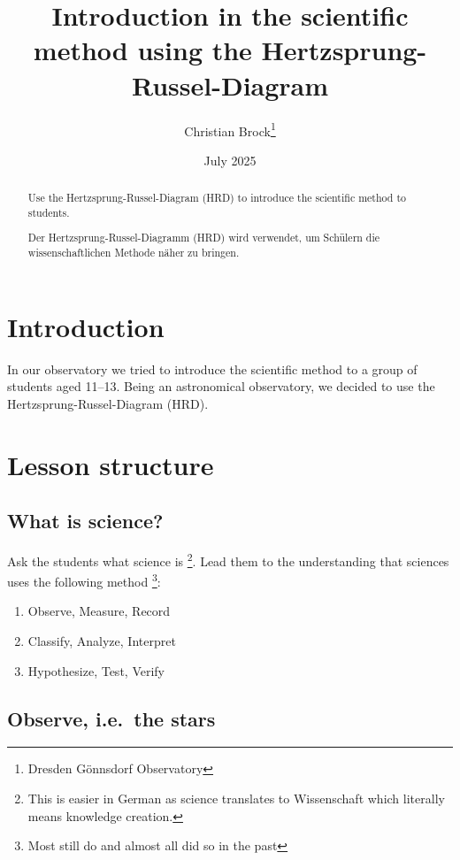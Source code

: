 \documentclass[a4paper]{article}
\author{Christian Brock\footnote{Dresden Gönnsdorf Observatory}}
\title{Introduction in the scientific method using the Hertzsprung-Russel-Diagram}
\date{July 2025}
\begin{document}
	\maketitle

    \begin{abstract}
        Use the Hertzsprung-Russel-Diagram (HRD) to introduce the scientific method to students.

        \bigskip
        \bigskip

        Der Hertzsprung-Russel-Diagramm (HRD) wird verwendet, um Schülern die wissenschaftlichen Methode näher zu bringen.
    \end{abstract}

   	\section{Introduction}

	In our observatory we tried to introduce the scientific method to a group of students aged 11--13.
    Being an astronomical observatory, we decided to use the Hertzsprung-Russel-Diagram (HRD).

    \section{Lesson structure}

    \subsection*{What is science?}

    Ask the students what science is \footnote{This is easier in German as science translates to Wissenschaft which literally means knowledge creation.}.
    Lead them to the understanding that sciences uses the following method
    \footnote{Most still do and almost all did so in the past}:
    \begin{enumerate}
        \item Observe, Measure, Record
        \item Classify, Analyze, Interpret
        \item Hypothesize, Test, Verify
    \end{enumerate}

    \subsection*{Observe, i.e.\ the stars}
\end{document}
